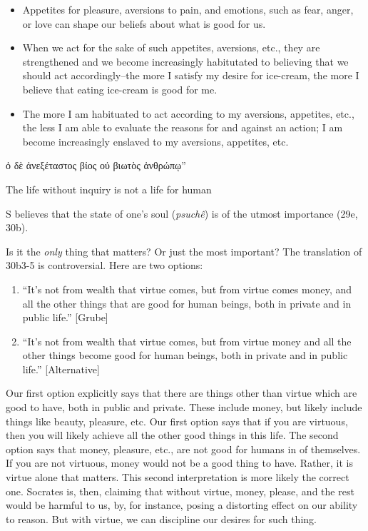 \documentclass[oneside]{article}
\begin{document}
\begin{description}
\begin{description}
\begin{itemize}
\item Appetites  for pleasure, aversions to pain, and emotions, such as fear, anger, or love can shape our beliefs about what is good for us. 
\item When we act for the sake of such appetites, aversions, etc., they are strengthened and we become increasingly habitutated to believing that we should act accordingly--the  more I satisfy my desire for ice-cream, the more I believe that eating ice-cream is good for me.
\item The more I am habituated to act according to my aversions, appetites, etc., the less I am able to evaluate the reasons for and against an action; I am become increasingly enslaved to my aversions, appetites, etc. 
\end{itemize}
\end{description}
\end{description} 


 



 ὁ δὲ ἀνεξέταστος βίος οὐ βιωτὸς ἀνθρώπῳ”

The life without inquiry is not a life for human


S believes that the state of one's soul (\emph{psuch\^{e}}) is of the utmost importance (29e, 30b).

 Is it the \emph{only} thing that matters? Or just the most important? The translation of 30b3-5 is controversial. Here are two options:
\begin{enumerate}
\item ``It's not from wealth that virtue comes, but from virtue comes money, and all the other things that are good for human beings, both in private and in public life.'' [Grube]
\item  ``It's not from wealth that virtue comes, but from virtue money and all the other things become good for human beings, both in private and in public life.'' [Alternative]
\end{enumerate}
Our first option explicitly says that there are things other than virtue which are good to have, both in public and private. These include money, but likely include things like beauty, pleasure, etc. Our first option says that if you are virtuous, then you will likely achieve all the other good things in this life. The second option says that money, pleasure, etc., are not good for humans in of themselves. If you are not virtuous, money would not be a good thing to have. Rather, it is virtue alone that matters. This second interpretation is more likely the correct one. Socrates is, then, claiming that without virtue, money, please, and the rest would be harmful to us, by, for instance, posing a distorting effect on our ability to reason. But with virtue, we can discipline our desires for such thing. 
\end{document}
